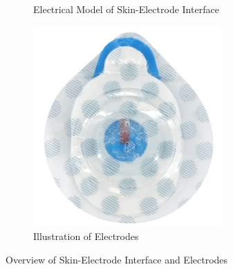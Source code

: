 \begin{figure}[h]
	\centering
	\begin{subfigure}{0.4\textwidth}
		\centering
		
		\caption{Electrical Model of Skin-Electrode Interface \cite{lee_kruse_2020}}
		\label{fig:skin_electrode_interface}
	\end{subfigure} %
	\hfill %
	\begin{subfigure}{0.4\textwidth}
		\centering
		\includegraphics[width=0.8\textwidth]{images/electrodesample}
		\caption{Illustration of Electrodes\cite{blue_sensor_t00}}
		\label{fig:electrodes}
	\end{subfigure} %
	\caption{Overview of Skin-Electrode Interface and Electrodes}
	\label{fig:electrodes_and_interface}
\end{figure}

